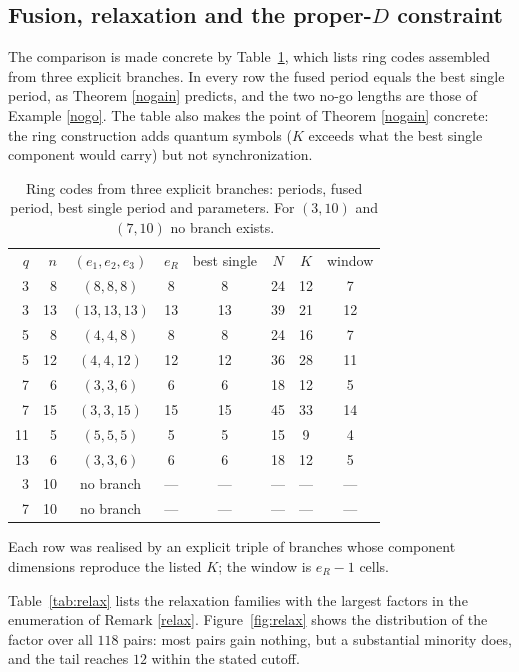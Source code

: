 \documentclass[11pt,reqno]{amsart}
\theoremstyle{definition}
\theoremstyle{remark}
\begin{document}
\subsection{Fusion, relaxation and the proper-$D$ constraint}

The comparison is made concrete by Table~\ref{tab:fusion}, which lists ring codes assembled from three explicit branches. In every row the fused period equals the best single period, as Theorem \ref{nogain} predicts, and the two no-go lengths are those of Example \ref{nogo}. The table also makes the point of Theorem \ref{nogain} concrete: the ring construction adds quantum symbols ($K$ exceeds what the best single component would carry) but not synchronization.


\begin{table}[t]
\centering
\caption{Ring codes from three explicit branches: periods, fused period, best single period and parameters. For $(3,10)$ and $(7,10)$ no branch exists.\label{tab:fusion}}
\small
\begin{tabular}{rrcccccc}
\toprule
$q$ & $n$ & $(e_1,e_2,e_3)$ & $e_R$ & best single & $N$ & $K$ & window \\
3 & 8 & $(8,8,8)$ & 8 & 8 & 24 & 12 & 7 \\
3 & 13 & $(13,13,13)$ & 13 & 13 & 39 & 21 & 12 \\
5 & 8 & $(4,4,8)$ & 8 & 8 & 24 & 16 & 7 \\
5 & 12 & $(4,4,12)$ & 12 & 12 & 36 & 28 & 11 \\
7 & 6 & $(3,3,6)$ & 6 & 6 & 18 & 12 & 5 \\
7 & 15 & $(3,3,15)$ & 15 & 15 & 45 & 33 & 14 \\
11 & 5 & $(5,5,5)$ & 5 & 5 & 15 & 9 & 4 \\
13 & 6 & $(3,3,6)$ & 6 & 6 & 18 & 12 & 5 \\
3 & 10 & no branch & --- & --- & --- & --- & --- \\
7 & 10 & no branch & --- & --- & --- & --- & --- \\
\bottomrule
\end{tabular}

\smallskip
\parbox{\linewidth}{\footnotesize Each row was realised by an explicit triple of branches whose component dimensions reproduce the listed $K$; the window is $e_R-1$ cells.}
\end{table}

Table~\ref{tab:relax} lists the relaxation families with the largest factors in the enumeration of Remark \ref{relax}. Figure~\ref{fig:relax} shows the distribution of the factor over all $118$ pairs: most pairs gain nothing, but a substantial minority does, and the tail reaches $12$ within the stated cutoff.
\end{document}
